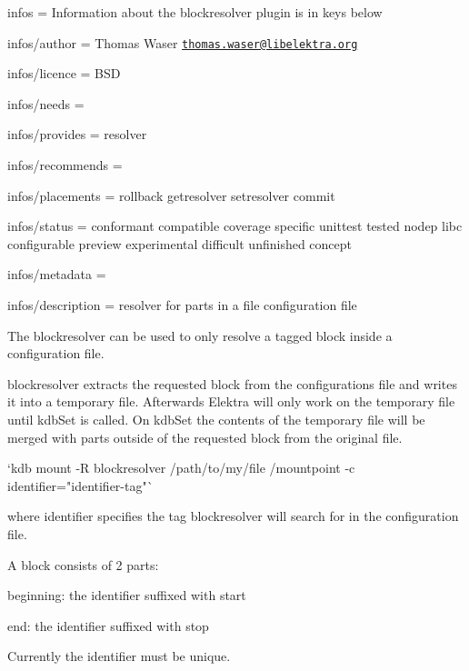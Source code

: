
\begin{DoxyItemize}
\item infos = Information about the blockresolver plugin is in keys below
\item infos/author = Thomas Waser \href{mailto:thomas.waser@libelektra.org}{\tt thomas.\+waser@libelektra.\+org}
\item infos/licence = B\+SD
\item infos/needs =
\item infos/provides = resolver
\item infos/recommends =
\item infos/placements = rollback getresolver setresolver commit
\item infos/status = conformant compatible coverage specific unittest tested nodep libc configurable preview experimental difficult unfinished concept
\item infos/metadata =
\item infos/description = resolver for parts in a file configuration file
\end{DoxyItemize}

The {\ttfamily blockresolver} can be used to only resolve a tagged block inside a configuration file.

{\ttfamily blockresolver} extracts the requested block from the configurations file and writes it into a temporary file. Afterwards Elektra will only work on the temporary file until kdb\+Set is called. On kdb\+Set the contents of the temporary file will be merged with parts outside of the requested block from the original file.

\begin{DoxyVerb}`kdb mount -R blockresolver /path/to/my/file /mountpoint -c identifier="identifier-tag"`
\end{DoxyVerb}


where {\ttfamily identifier} specifies the tag {\ttfamily blockresolver} will search for in the configuration file.

A block consists of 2 parts\+:


\begin{DoxyItemize}
\item beginning\+: the identifier suffixed with {\ttfamily start}
\item end\+: the identifier suffixed with {\ttfamily stop}
\end{DoxyItemize}

Currently the identifier must be unique.


